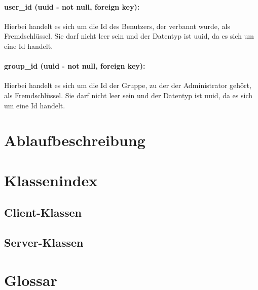 \documentclass[parskip=full]{scrartcl}
\begin{document}
\paragraph{user\_id (uuid - not null, foreign key):} Hierbei handelt es sich um die Id des Benutzers, der verbannt wurde, als Fremdschlüssel. Sie darf nicht leer sein und der Datentyp ist \Gls{uuid}, da es sich um eine Id handelt.
\paragraph{group\_id (uuid - not null, foreign key):} Hierbei handelt es sich um die Id der Gruppe, zu der der Administrator gehört, als Fremdschlüssel. Sie darf nicht leer sein und der Datentyp ist \Gls{uuid}, da es sich um eine Id handelt.
\newpage

\section{Ablaufbeschreibung}

\section{Klassenindex}
\subsection{Client-Klassen}
\subsection{Server-Klassen}
\newpage
\section{Glossar}
\printglossary[style=altlist]
\end{document}
